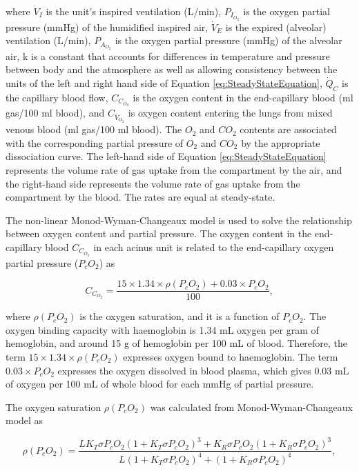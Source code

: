 \noindent where $\dot{V}_I$ is the unit's inspired ventilation (L/min), $P_{I_{O_2}}$ is the oxygen partial pressure (mmHg) of the humidified inspired air,  $\dot{V}_E$ is the expired (alveolar) ventilation (L/min), $P_{A_{O_2}}$ is the oxygen partial pressure (mmHg) of the alveolar air, k is a constant that accounts for differences in temperature and pressure between body and the atmosphere as well as allowing consistency between the units of the left and right hand side of Equation \ref{eq:SteadyStateEquation}, $\dot{Q}_C$ is the capillary blood flow, $C_{C_{O_2}}$ is the oxygen content in the end-capillary blood (ml gas/100 ml blood), and $C_{\bar{V}_{O_2}}$ is oxygen content entering the lungs from mixed venous blood (ml gas/100 ml blood). The $O_2$ and $CO_2$ contents are associated with the corresponding partial pressure of $O_2$ and $CO_2$ by the appropriate dissociation curve. The left-hand side of Equation \ref{eq:SteadyStateEquation} represents the volume rate of gas uptake from the compartment by the air, and the right-hand side represents the volume rate of gas uptake from the compartment by the blood. The rates are equal at steady-state.

The non-linear Monod-Wyman-Changeaux model \citep{monod1965nature} is used to solve the relationship between oxygen content and partial pressure. The oxygen content in the end-capillary blood $C_{C_{O_2}}$ in each acinus unit is related to the end-capillary oxygen partial pressure ($P_cO_2$) as

\begin{equation} 
 \label{eq:OxygenContent}
 C_{C_{O_2}} = \frac{15 \times 1.34 \times \rho(P_cO_2) + 0.03 \times P_cO_2}{100},
\end{equation}

\noindent where $\rho(P_cO_2)$ is the oxygen saturation, and it is a function of $P_cO_2$. The oxygen binding capacity with haemoglobin is 1.34 mL oxygen per gram of hemoglobin, and around 15 g of hemoglobin per 100 mL of blood. Therefore, the term $15 \times 1.34 \times \rho(P_cO_2)$ expresses oxygen bound to haemoglobin. The term $0.03 \times P_cO_2$ expresses the oxygen dissolved in blood plasma, which gives 0.03 mL of oxygen per 100 mL of whole blood for each mmHg of partial pressure.

The oxygen saturation $\rho(P_cO_2)$ was calculated from Monod-Wyman-Changeaux model \citep{monod1965nature} as

\begin{equation} 
 \label{eq:OxygenSaturation}
 \rho(P_cO_2) = \frac{LK_T \sigma P_cO_2 (1+K_T\sigma P_cO_2)^3 + K_R\sigma P_cO_2(1+K_R\sigma P_cO_2)^3}{L(1+K_T \sigma P_cO_2)^4 + (1+K_R \sigma P_cO_2)^4},
\end{equation}

